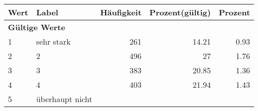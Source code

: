      \begin{longtable}{lXrrr}
     \toprule
     \textbf{Wert} & \textbf{Label} & \textbf{Häufigkeit} & \textbf{Prozent(gültig)} & \textbf{Prozent} \\
     \endhead
     \midrule
     \multicolumn{5}{l}{\textbf{Gültige Werte}}\\

     1 &
     \multicolumn{1}{X}{ sehr stark   } &


       \num{261} &
       \num[round-mode=places,round-precision=2]{14.21} &
         \num[round-mode=places,round-precision=2]{0.93} \\

     2 &
     \multicolumn{1}{X}{ 2   } &


       \num{496} &
       \num[round-mode=places,round-precision=2]{27} &
         \num[round-mode=places,round-precision=2]{1.76} \\

     3 &
     \multicolumn{1}{X}{ 3   } &


       \num{383} &
       \num[round-mode=places,round-precision=2]{20.85} &
         \num[round-mode=places,round-precision=2]{1.36} \\

     4 &
     \multicolumn{1}{X}{ 4   } &


       \num{403} &
       \num[round-mode=places,round-precision=2]{21.94} &
         \num[round-mode=places,round-precision=2]{1.43} \\

     5 &
     \multicolumn{1}{X}{ überhaupt nicht   } &



\end{longtable}
